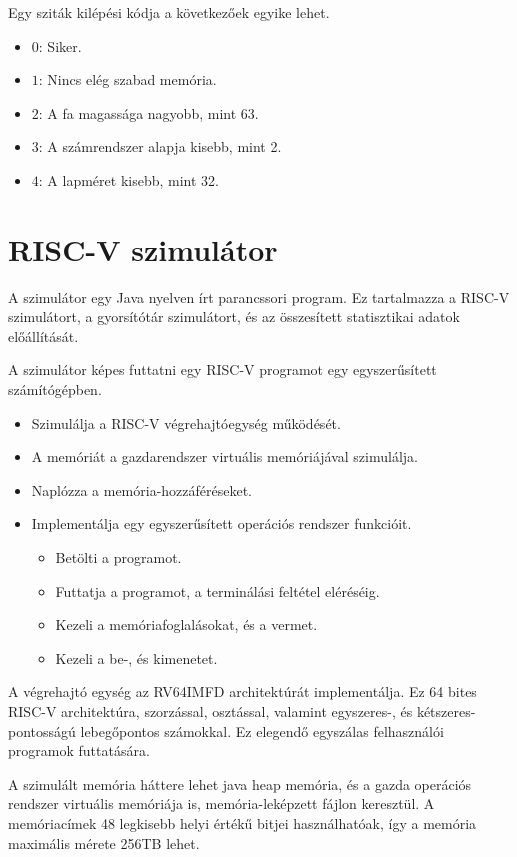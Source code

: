 \documentclass[12pt]{report}
\begin{document}
Egy sziták kilépési kódja a következőek egyike lehet.
\begin{itemize}
\item $0$: Siker.
\item $1$: Nincs elég szabad memória.
\item $2$: A fa magassága nagyobb, mint 63.
\item $3$: A számrendszer alapja kisebb, mint 2.
\item $4$: A lapméret kisebb, mint 32.
\end{itemize}

\section{RISC-V szimulátor}

A szimulátor egy Java nyelven írt parancssori program.
Ez tartalmazza a RISC-V szimulátort,
a gyorsítótár szimulátort,
és az összesített statisztikai adatok előállítását.

A szimulátor képes futtatni egy RISC-V programot egy egyszerűsített
számítógépben.
\begin{itemize}
\item Szimulálja a RISC-V végrehajtóegység működését.
\item A memóriát a gazdarendszer virtuális memóriájával szimulálja.
\item Naplózza a memória-hozzáféréseket.
\item Implementálja egy egyszerűsített operációs rendszer funkcióit.
\begin{itemize}
\item Betölti a programot.
\item Futtatja a programot, a terminálási feltétel eléréséig.
\item Kezeli a memóriafoglalásokat, és a vermet.
\item Kezeli a be-, és kimenetet.
\end{itemize}
\end{itemize}

A végrehajtó egység az RV64IMFD\cite{riscv-isa} architektúrát implementálja.
Ez 64 bites RISC-V architektúra, szorzással, osztással,
valamint egyszeres-, és kétszeres-pontosságú lebegőpontos számokkal.
Ez elegendő egyszálas felhasználói programok futtatására.

A szimulált memória háttere lehet java heap memória,
és a gazda operációs rendszer virtuális memóriája is,
memória-leképzett fájlon keresztül.
A memóriacímek 48 legkisebb helyi értékű bitjei használhatóak,
így a memória maximális mérete 256TB lehet.
\end{document}
